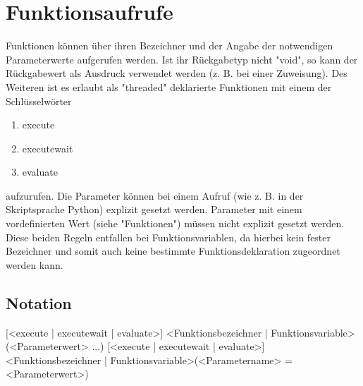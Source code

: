 \chapter{Funktionsaufrufe}
Funktionen können über ihren Bezeichner und der Angabe der notwendigen Parameterwerte aufgerufen werden. Ist ihr Rückgabetyp nicht "void", so kann
der Rückgabewert als Ausdruck verwendet werden (z. B. bei einer Zuweisung).
Des Weiteren ist es erlaubt als "threaded" deklarierte Funktionen mit einem der Schlüsselwörter
\begin{enumerate}
\item execute
\item executewait
\item evaluate
\end{enumerate}
aufzurufen.
Die Parameter können bei einem Aufruf (wie z. B. in der Skriptsprache Python) explizit gesetzt werden. Parameter mit einem vordefinierten Wert (siehe
"Funktionen") müssen nicht explizit gesetzt werden.
Diese beiden Regeln entfallen bei Funktionsvariablen, da hierbei kein fester Bezeichner und somit auch keine bestimmte Funktionsdeklaration zugeordnet werden kann.

\section{Notation}
[<execute | executewait | evaluate>] <Funktionsbezeichner | Funktionsvariable>(<Parameterwert> ...)
[<execute | executewait | evaluate>] <Funktionsbezeichner | Funktionsvariable>(<Parametername> = <Parameterwert>)